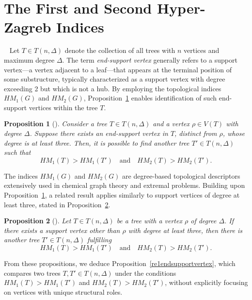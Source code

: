 \documentclass{article}
\newtheorem{proposition}{Proposition}[section]
\theoremstyle{definition}
\begin{document}
\section{The First and Second Hyper-Zagreb Indices}~\label{sec3}
Let $T \in T(n, \Delta)$ denote the collection of all trees with $n$ vertices and maximum degree $\Delta$. The term \emph{end-support vertex} generally refers to a support vertex---a vertex adjacent to a leaf---that appears at the terminal position of some substructure, typically characterized as a support vertex with degree exceeding 2 but which is not a hub. By employing the topological indices $HM_{1}(G)$ and $HM_{2}(G)$, Proposition~\ref{pro1endsupportvertex} enables identification of such end-support vertices within the tree $T$.

\begin{proposition}[\cite{Dehgardi2025AramHM}]\label{pro1endsupportvertex}
Consider a tree $T \in T(n, \Delta)$ and a vertex $\rho \in V(T)$ with degree $\Delta$. Suppose there exists an end-support vertex in $T$, distinct from $\rho$, whose degree is at least three. Then, it is possible to find another tree $T' \in T(n, \Delta)$ such that
\[
HM_{1}(T) > HM_{1}(T') \quad \text{and} \quad HM_{2}(T) > HM_{2}(T').
\]
\end{proposition}

The indices $HM_1(G)$ and $HM_2(G)$ are degree-based topological descriptors extensively used in chemical graph theory and extremal problems. Building upon Proposition~\ref{pro1endsupportvertex}, a related result applies similarly to support vertices of degree at least three, stated in Proposition~\ref{pro1supportvertex}.

\begin{proposition}[\cite{Dehgardi2025AramHM}]\label{pro1supportvertex}
Let $T \in T(n, \Delta)$ be a tree with a vertex $\rho$ of degree $\Delta$. If there exists a support vertex other than $\rho$ with degree at least three, then there is another tree $T' \in T(n, \Delta)$ fulfilling
\[
HM_{1}(T) > HM_{1}(T') \quad \text{and} \quad HM_{2}(T) > HM_{2}(T').
\]
\end{proposition}

From these propositions, we deduce Proposition~\ref{re1endsupportvertex}, which compares two trees $T, T' \in T(n,\Delta)$ under the conditions $HM_1(T) > HM_1(T')$ and $HM_2(T) > HM_2(T')$, without explicitly focusing on vertices with unique structural roles.
\end{document}
